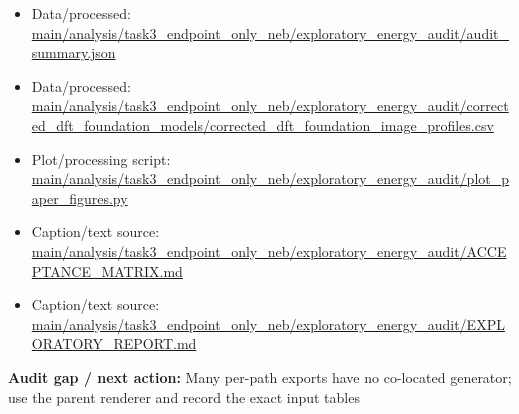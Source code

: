 \documentclass[10pt]{article}
\newcommand{\statusline}[1]{\colorbox{gray!12}{\parbox{0.96\linewidth}{#1}}}
\begin{document}
\begin{itemize}[leftmargin=1.4em,noitemsep]
\item Data/processed: \begingroup\scriptsize\url{main/analysis/task3_endpoint_only_neb/exploratory_energy_audit/audit_summary.json}\endgroup
\item Data/processed: \begingroup\scriptsize\url{main/analysis/task3_endpoint_only_neb/exploratory_energy_audit/corrected_dft_foundation_models/corrected_dft_foundation_image_profiles.csv}\endgroup
\item Plot/processing script: \begingroup\scriptsize\url{main/analysis/task3_endpoint_only_neb/exploratory_energy_audit/plot_paper_figures.py}\endgroup
\item Caption/text source: \begingroup\scriptsize\url{main/analysis/task3_endpoint_only_neb/exploratory_energy_audit/ACCEPTANCE_MATRIX.md}\endgroup
\item Caption/text source: \begingroup\scriptsize\url{main/analysis/task3_endpoint_only_neb/exploratory_energy_audit/EXPLORATORY_REPORT.md}\endgroup
\end{itemize}
\statusline{\textbf{Audit gap / next action:} Many per-path exports have no co-located generator; use the parent renderer and record the exact input tables}
\vfill
\clearpage
\end{document}
